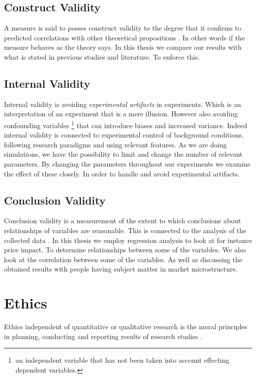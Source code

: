 \documentclass{kththesis}
\theoremstyle{definition}
\begin{document}
\subsection{Construct Validity}
A measure is said to posses construct validity to the degree that it confirms to predicted correlations with other theoretical propositions \parencite{kothari2004research}. In other words if the measure behaves as the theory says. In this thesis we compare our results with what is stated in previous studies and literature. To enforce this.  

\subsection{Internal Validity}
Internal validity is avoiding \textit{experimental artifacts} in experiments. Which is an interpretation of an experiment that is a mere illusion. However also avoiding confounding variables \footnote{an independent variable that has not been taken into account effecting dependent variables.} that can introduce biases and increased variance. Indeed internal validity is connected to experimental control of background conditions, following research paradigms and using relevant features. As we are doing simulations, we have the possibility to limit and change the number of relevant parameters. By changing the parameters throughout our experiments we examine the effect of these closely. In order to handle and avoid experimental artifacts.

\subsection{Conclusion Validity}
Conclusion validity is a measurement of the extent to which conclusions about relationships of variables are reasonable. This is connected to the analysis of the collected data \parencite{trochim_2006}. In this thesis we employ regression analysis to look at for instance price impact. To determine relationships between some of the variables. We also look at the correlation between some of the variables. As well as discussing the obtained results with people having subject matter in market microstructure.

\section{Ethics}
Ethics independent of quantitative or qualitative research is the moral principles in planning, conducting and reporting results of research studies \parencite{haakansson2013portal}.
\end{document}
